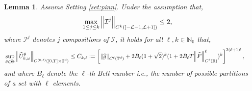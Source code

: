 \documentclass{article}
\numberwithin{equation}{section}
\newcommand{\T}{\mathbb{T}}
\newcommand{\R}{\mathbb{R}}
\newcommand{\N}{\mathbb{N}}
\newcommand{\cI}{\mathcal{I}}
\newcommand{\cL}{\mathcal{L}}
\newcommand{\1}{\mathbbm{1}}
\newcommand{\Fhat}{\widehat{F}}
\newcommand{\Uhat}{\widehat{U}}
\newcommand{\ghat}{\widehat{g}}
\newtheorem{lemma}[theorem]{Lemma}
\begin{document}
\begin{lemma}\label{lem:space-der-nn}
Assume Setting \ref{set:pinn}. Under the assumption that,
\begin{equation}
\max_{1\leq j\leq k}\norm{\cI^j}_{C^k([-\cL-1, \cL+1])}\leq 2, 
\end{equation}
where $\cI^j$ denotes $j$ compositions of $\cI$, it holds for all $\ell, k\in\N_0$ that,
\begin{equation}\label{eq:pinn-x-claim}
\begin{split}
     &\sup_{\theta\in\Theta} \norm{ \Uhat^\theta_{k,\omega}}_{C^{(0,\ell)}([0,T]\times\T^d)} \leq C_{k,\ell} := \left[\norm{\ghat}_{C^\ell(\T^d)}+2B_\ell (1+\sqrt{2})^k (1+2B_\ell T\norm{\Fhat}_{C^\ell(\R)}^\ell)^k\right]^{2(\ell+1)!},
\end{split}
\end{equation}
and where $B_\ell$ denote the $\ell$-th Bell number i.e., the number of possible partitions of a set with $\ell$ elements. 
\end{lemma}
\end{document}
